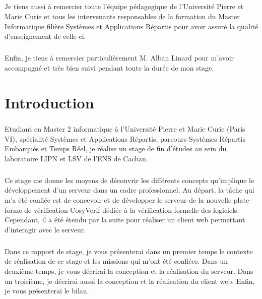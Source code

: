\documentclass{report}
\begin{document}
\paragraph{}
Je tiens aussi à remercier toute l'équipe pédagogique de l'Université Pierre et Marie Curie et tous les intervenants 
responsables de la formation du Master Informatique filière Systèmes et Applications Répartis pour avoir assuré la qualité
d’enseignement de celle-ci.

\paragraph{}
Enfin, je tiens à remercier particulièrement M. Alban Linard pour m'avoir accompagné et très bien suivi pendant toute la 
durée de mon stage.


\chapter*{Introduction}

\paragraph{}
Etudiant en Master 2 informatique à l’Université Pierre et Marie Curie (Paris VI), spécialité Systèmes et Applications 
Répartis, parcours Systèmes Répartis Embarqués et Temps Réel, je réalise un stage de fin d'études au sein du laboratoire 
LIPN et LSV de l'ENS de Cachan. 

\paragraph{}
Ce stage me donne les moyens de découvrir les différents concepts qu'implique le développement d'un serveur dans un cadre 
professionnel. Au départ, la tâche qui m'a été confiée est de concevoir et de développer le serveur de la nouvelle plate-forme 
de vérification CosyVerif dédiée à la vérification formelle des logiciels. Cependant, il a été étendu par la suite pour réaliser un 
client web permettant d'interagir avec le serveur.

\paragraph{}
Dans ce rapport de stage, je vous présenterai dans un premier temps le contexte de réalisation de ce stage et les missions 
qui m'ont été confiées. Dans un deuxième temps, je vous décrirai la conception et la réalisation du serveur. Dans un troisième,
je décrirai aussi la conception et la réalisation du client web. Enfin, je vous présenterai le bilan.
\end{document}
